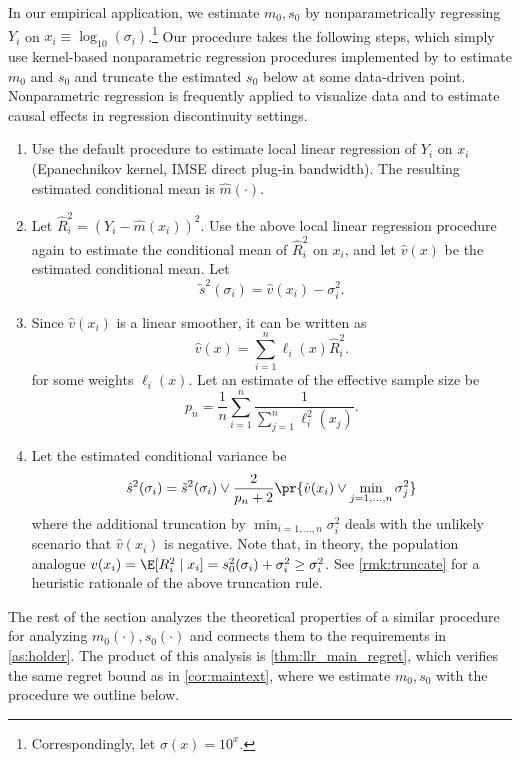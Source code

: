 \documentclass[12pt, reqno]{amsart}
\newcommand{\hatm}{\hat m}
\numberwithin{equation}{section}
\begin{document}
\begin{refsection}
\begin{appendices}
In our empirical application, we estimate $m_0, s_0$ by nonparametrically regressing $Y_i$
on $x_i \equiv \log_{10}(\sigma_i)$.\footnote{Correspondingly, let $\sigma(x) = 10^x.$}
Our procedure takes the following steps, which simply use kernel-based nonparametric
regression procedures implemented by \citet{calonico2019nprobust}
to estimate $m_0$ and $s_0$ and truncate the estimated $s_0$ below at some data-driven
point. Nonparametric regression is frequently applied to visualize data and to estimate
causal effects in regression discontinuity settings. 
\begin{enumerate}[label=(E-\arabic*)]
  \item \label{item:e1} Use the default procedure \citet{calonico2019nprobust} to
  estimate
  local linear regression of $Y_i$ on $x_i$ (Epanechnikov kernel, IMSE direct plug-in
  bandwidth). The resulting estimated conditional mean is
  $\hatm(\cdot)$. 
  \item Let $\hat R_i^2 = (Y_i - \hatm(x_i))^2$. Use the above local linear regression
   procedure again to estimate the conditional mean of $\hat R_i^2$ on $x_i$, and let
   $\hat v(x)$ be the estimated conditional mean. Let \[
\tilde s^2(\sigma_i) = \hat v(x_i) - \sigma_i^2. 
  \]
  \item Since $\hat v(x_i)$ is a linear smoother, it can be written as \[
\hat v(x) = \sum_{i=1}^n \ell_i(x) \hat R_i^2. 
  \] 
  for some weights $\ell_i(x)$.
  Let an estimate of the effective sample size be \[
p_n = \frac{1}{n}\sum_{i=1}^n \frac{1}{\sum_{j=1}^n \ell_i^2(x_j)}.
  \]
  \item \label{item:e4} Let the estimated conditional variance be \[
\hat s^2(\sigma_i) = \tilde s^2(\sigma_i) \vee \frac{2}{p_n+2} \pr{\hat v(x_i) \vee
\min_{j=1,\ldots, n} \sigma_j^2}
  \]
  where the additional truncation by $\min_{i=1,\ldots, n} \sigma_i^2$ deals with the
  unlikely scenario that $\hat v(x_i)$ is negative. Note that, in theory, the population
  analogue $v (x_i) = \E
  [R_i^2 \mid x_i] = s_0^2(\sigma_i) + \sigma_i^2 \ge \sigma_i^2$. See \cref{rmk:truncate}
  for a heuristic rationale of the above truncation rule. 
\end{enumerate}

The rest of the section analyzes the theoretical properties of a similar procedure for
analyzing $m_0(\cdot), s_0(\cdot)$ and connects them to the requirements in 
\cref{as:holder}. The product of this analysis is \cref{thm:llr_main_regret}, which
 verifies the same regret bound as in \cref{cor:maintext}, where we estimate $m_0, s_0$
 with the procedure we outline below.


\end{appendices}
\end{refsection}
\end{document}
